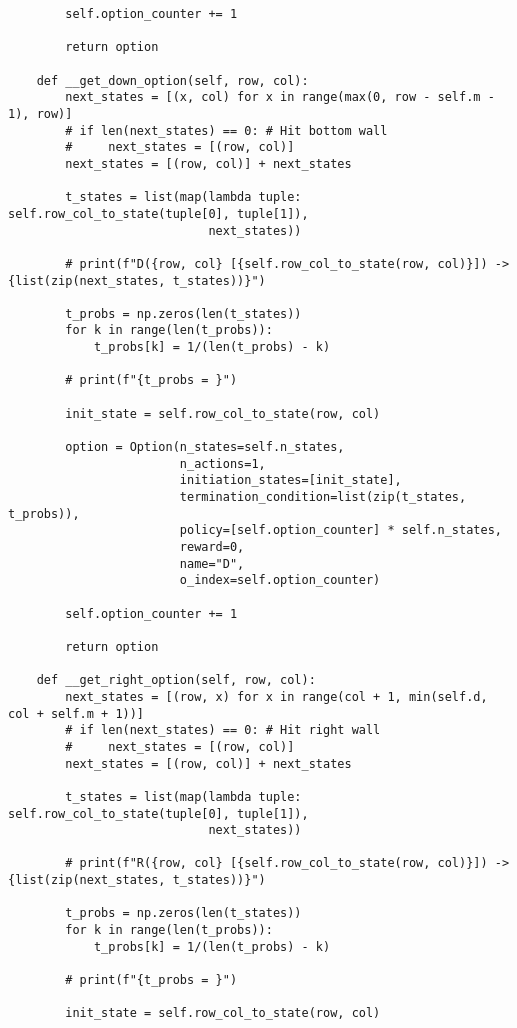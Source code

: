 \begin{verbatim}
        self.option_counter += 1

        return option

    def __get_down_option(self, row, col):
        next_states = [(x, col) for x in range(max(0, row - self.m - 1), row)]
        # if len(next_states) == 0: # Hit bottom wall
        #     next_states = [(row, col)]
        next_states = [(row, col)] + next_states

        t_states = list(map(lambda tuple: self.row_col_to_state(tuple[0], tuple[1]),
                            next_states))

        # print(f"D({row, col} [{self.row_col_to_state(row, col)}]) -> {list(zip(next_states, t_states))}")

        t_probs = np.zeros(len(t_states))
        for k in range(len(t_probs)):
            t_probs[k] = 1/(len(t_probs) - k)

        # print(f"{t_probs = }")

        init_state = self.row_col_to_state(row, col)

        option = Option(n_states=self.n_states,
                        n_actions=1,
                        initiation_states=[init_state],
                        termination_condition=list(zip(t_states, t_probs)),
                        policy=[self.option_counter] * self.n_states,
                        reward=0,
                        name="D",
                        o_index=self.option_counter)

        self.option_counter += 1

        return option

    def __get_right_option(self, row, col):
        next_states = [(row, x) for x in range(col + 1, min(self.d, col + self.m + 1))]
        # if len(next_states) == 0: # Hit right wall
        #     next_states = [(row, col)]
        next_states = [(row, col)] + next_states

        t_states = list(map(lambda tuple: self.row_col_to_state(tuple[0], tuple[1]),
                            next_states))

        # print(f"R({row, col} [{self.row_col_to_state(row, col)}]) -> {list(zip(next_states, t_states))}")

        t_probs = np.zeros(len(t_states))
        for k in range(len(t_probs)):
            t_probs[k] = 1/(len(t_probs) - k)

        # print(f"{t_probs = }")

        init_state = self.row_col_to_state(row, col)


\end{verbatim}
